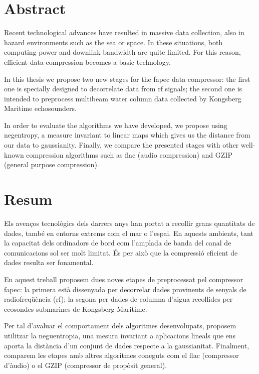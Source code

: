 \chapter*{Abstract}
Recent technological advances have resulted in massive data collection, also in hazard environments such as the sea or space. In these situations, both computing power and downlink bandwidth are quite limited. For this reason, efficient data compression becomes a basic technology.

In this thesis we propose two new stages for the \acrshort{fapec} data compressor: the first one is specially designed to decorrelate data from \acrfull{rf} signals; the second one is intended to preprocess multibeam water column data collected by Kongsberg Maritime echosounders.

In order to evaluate the algorithms we have developed, we propose using negentropy, a measure invariant to linear maps which gives us the distance from our data to gaussianity. Finally, we compare the presented stages with other well-known compression algorithms such as \acrshort{flac} (audio compression) and GZIP (general purpose compression).

\chapter*{Resum}
Els avenços tecnològics dels darrers anys han portat a recollir grans quantitats de dades, també en entorns extrems com el mar o l’espai. En aquests ambients, tant la capacitat dels ordinadors de bord com l’amplada de banda del canal de comunicacions sol ser molt limitat. És per això que la compressió eficient de dades resulta ser fonamental.

En aquest treball proposem dues noves etapes de preprocessat pel compressor \acrshort{fapec}: la primera està dissenyada per decorrelar dades provinents de senyals de radiofreqüència (\acrshort{rf}); la segona per dades de columna d’aigua recollides per ecosondes submarines de Kongsberg Maritime.

Per tal d’avaluar el comportament dels algoritmes desenvolupats, proposem utilitzar la neguentropia, una mesura invariant a aplicacions lineals que ens aporta la distància d’un conjunt de dades respecte a la gaussianitat. Finalment, comparem les etapes amb altres algoritmes coneguts com el \acrshort{flac} (compressor d’àudio) o el GZIP (compressor de propòsit general).
